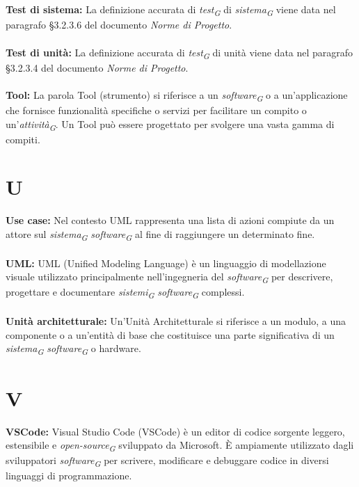\documentclass{article}
\begin{document}
\\
\\
\textbf{Test di sistema:}  La definizione accurata di \textit{test}\textsubscript{\textit{G}} di \textit{sistema}\textsubscript{\textit{G}} viene data nel paragrafo §3.2.3.6 del documento \textit{Norme di Progetto}.
\\
\\
\textbf{Test di unità:}  La definizione accurata di \textit{test}\textsubscript{\textit{G}} di unità viene data nel paragrafo §3.2.3.4 del documento \textit{Norme di Progetto}.
\\
\\
\textbf{Tool:} La parola Tool (strumento) si riferisce a un \textit{software}\textsubscript{\textit{G}} o a un'applicazione che fornisce funzionalità specifiche o servizi per facilitare un compito o un'\textit{attività}\textsubscript{\textit{G}}. Un Tool può essere progettato per svolgere una vasta gamma di compiti.
\pagebreak
\section*{U}
{}
\textbf{Use case:} Nel contesto UML rappresenta una lista di azioni compiute da un attore sul \textit{sistema}\textsubscript{\textit{G}} \textit{software}\textsubscript{\textit{G}} al fine di raggiungere un determinato fine.
\\
\\
\textbf{UML:} UML (Unified Modeling Language) è un linguaggio di modellazione visuale utilizzato principalmente nell'ingegneria del \textit{software}\textsubscript{\textit{G}} per descrivere, progettare e documentare \textit{sistemi}\textsubscript{\textit{G}} \textit{software}\textsubscript{\textit{G}} complessi.
\\
\\
\textbf{Unità architetturale:} Un'Unità Architetturale si riferisce a un modulo, a una componente o a un'entità di base che costituisce una parte significativa di un \textit{sistema}\textsubscript{\textit{G}} \textit{software}\textsubscript{\textit{G}} o hardware. 
\pagebreak
\section*{V}
{}
\textbf{VSCode:} Visual Studio Code (VSCode) è un editor di codice sorgente leggero, estensibile e \textit{open-source}\textsubscript{\textit{G}} sviluppato da Microsoft. È ampiamente utilizzato dagli sviluppatori \textit{software}\textsubscript{\textit{G}} per scrivere, modificare e debuggare codice in diversi linguaggi di programmazione.
\pagebreak
\end{document}
